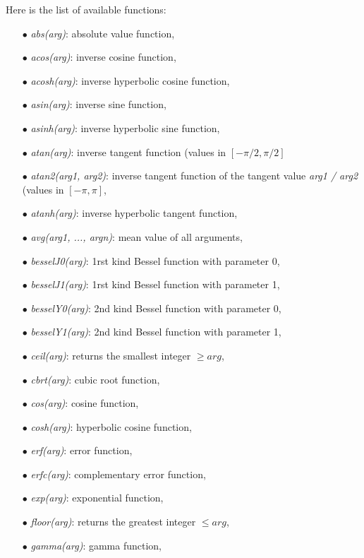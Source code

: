 Here is the list of available functions:
\begin{itemize}
\item[$\bullet$] \textit{abs(arg)}:  absolute value function,
\item[$\bullet$] \textit{acos(arg)}:  inverse cosine function,
\item[$\bullet$] \textit{acosh(arg)}:  inverse hyperbolic cosine function,
\item[$\bullet$] \textit{asin(arg)}:  inverse sine function,
\item[$\bullet$] \textit{asinh(arg)}:  inverse hyperbolic sine function,
\item[$\bullet$] \textit{atan(arg)}:  inverse tangent function (values in $[-\pi/2, \pi/2]$
\item[$\bullet$] \textit{atan2(arg1, arg2)}:  inverse tangent function of the tangent value \textit{arg1 / arg2} (values in $[-\pi, \pi]$,
\item[$\bullet$] \textit{atanh(arg)}:  inverse hyperbolic tangent function,
\item[$\bullet$] \textit{avg(arg1, ..., argn)}:  mean value of all arguments,
\item[$\bullet$] \textit{besselJ0(arg)}:  1rst kind Bessel function with parameter 0,
\item[$\bullet$] \textit{besselJ1(arg)}:  1rst kind Bessel function with parameter 1,
\item[$\bullet$] \textit{besselY0(arg)}:  2nd kind Bessel function with parameter 0,
\item[$\bullet$] \textit{besselY1(arg)}:  2nd kind Bessel function with parameter 1,
\item[$\bullet$] \textit{ceil(arg)}:  returns the smallest integer $\geq arg$,
\item[$\bullet$] \textit{cbrt(arg)}:  cubic root function,
\item[$\bullet$] \textit{cos(arg)}:  cosine function,
\item[$\bullet$] \textit{cosh(arg)}:  hyperbolic cosine function,
\item[$\bullet$] \textit{erf(arg)}:  error function,
\item[$\bullet$] \textit{erfc(arg)}:  complementary error function,
\item[$\bullet$] \textit{exp(arg)}:  exponential function,
\item[$\bullet$] \textit{floor(arg)}: returns the greatest integer $\leq arg$,
\item[$\bullet$] \textit{gamma(arg)}:  gamma function,

\end{itemize}
